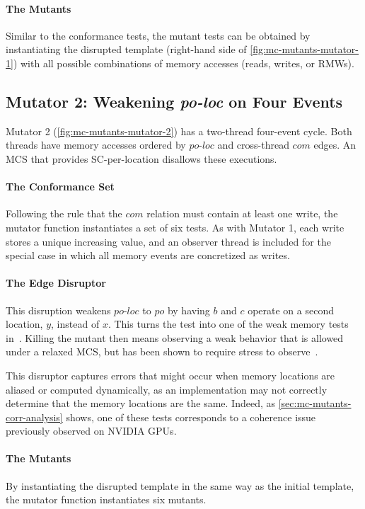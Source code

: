 \paragraph{The Mutants} Similar to the conformance tests, the mutant tests can be obtained by instantiating the disrupted template (right-hand side of \myfig\ref{fig:mc-mutants-mutator-1}) with all possible combinations of memory accesses (reads, writes, or RMWs).

\subsection{Mutator 2: Weakening \textit{po-loc} on Four Events \label{sec:mc-mutants-mutator-2}}
Mutator 2 (\myfig\ref{fig:mc-mutants-mutator-2}) has a two-thread four-event cycle. Both threads have memory accesses ordered by $\textit{po-loc}$ and cross-thread $com$ edges.
An MCS that provides SC-per-location disallows these executions.

\paragraph{The Conformance Set} Following the rule that the $com$ relation must contain at least one write, the mutator function instantiates a set of six tests. As with Mutator 1, each write stores a unique increasing value, and an observer thread is included for the special case in which all memory events are concretized as writes.

\paragraph{The Edge Disruptor} This disruption weakens $\textit{po-loc}$ to $po$ by having $b$ and $c$ operate on a second location, $y$, instead of $x$. This turns the test into one of the weak memory tests in~\cite{alglave2010fences}. Killing the mutant then means observing a weak behavior that is allowed under a relaxed MCS, but has been shown to require stress to observe~\cite{kirkham2020foundations}.

This disruptor captures errors that might occur when memory locations are aliased or computed dynamically, as an implementation may not correctly determine that the memory locations are the same. Indeed, as \mysec\ref{sec:mc-mutants-corr-analysis} shows, one of these tests corresponds to a coherence issue previously observed on NVIDIA GPUs.

\paragraph{The Mutants} By instantiating the disrupted template in the same way as the initial template, the mutator function instantiates six mutants.

